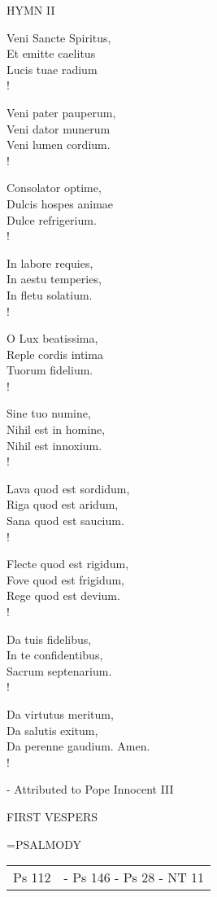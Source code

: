 \noindent\small{\uppercase{Hymn II}}\normalsize
\begin{cverse}
Veni Sancte Spiritus,\\
Et emitte caelitus\\
Lucis tuae radium\\!

Veni pater pauperum,\\
Veni dator munerum\\
Veni lumen cordium.\\!

Consolator optime,\\
Dulcis hospes animae\\
Dulce refrigerium.\\!

In labore requies,\\
In aestu temperies,\\
In fletu solatium.\\!

O Lux beatissima,\\
Reple cordis intima\\
Tuorum fidelium.\\!

Sine tuo numine,\\
Nihil est in homine,\\
Nihil est innoxium.\\!

Lava quod est sordidum,\\
Riga quod est aridum,\\
Sana quod est saucium.\\!

Flecte quod est rigidum,\\
Fove quod est frigidum,\\
Rege quod est devium.\\!

Da tuis fidelibus,\\
In te confidentibus,\\
Sacrum septenarium.\\!

Da virtutus meritum,\\
Da salutis exitum,\\
Da perenne gaudium. Amen.\\!
\end{cverse}
- Attributed to Pope Innocent III

\begin{flushleft}\normalsize FIRST VESPERS\\\end{flushleft}
\hangindent=\parindent \small{PSALMODY}
\begin{center}
\begin{tabular}{ l l }
Ps 112 &  - Ps 146 - Ps 28 - NT 11\\
\end{tabular}
\end{center}		

